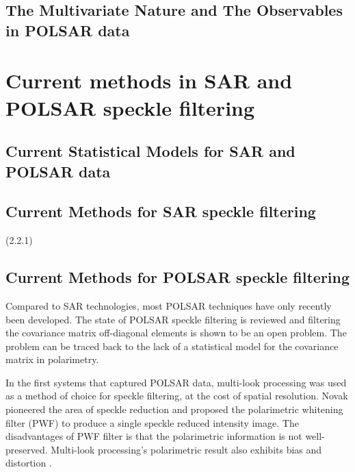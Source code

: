 \subsection{The Multivariate Nature and The Observables in POLSAR data}

\section{Current methods in SAR and POLSAR speckle filtering}

\subsection{Current Statistical Models for SAR and POLSAR data}

\subsection{Current Methods for SAR speckle filtering}
(2.2.1)

\subsection{Current Methods for POLSAR speckle filtering }

Compared to SAR technologies, most POLSAR techniques have only recently been developed. 
The state of POLSAR speckle filtering is reviewed and filtering the covariance matrix off-diagonal elements is shown to be an open problem.
The problem can be traced back to the lack of a statistical model for the covariance matrix in polarimetry.

In the first systems that captured POLSAR data, multi-look processing was used as a method of choice for speckle filtering, at the cost of spatial resolution.
Novak \cite{Novak_1990_TAES} pioneered the area of speckle reduction and proposed the polarimetric whitening filter (PWF) to produce a single speckle reduced intensity image. 
The disadvantages of PWF filter is that the polarimetric information is not well-preserved.
Multi-look processing's polarimetric result also exhibits bias and distortion \cite{Lee_2008_TGRS}.

